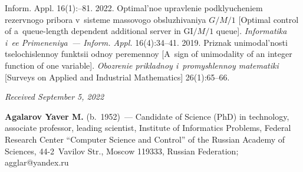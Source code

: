 \begin{multicols}{2}
{{\begin{thebibliography}{9}
{Inform. Appl.} 16(1):--81.
   2022. Op\-ti\-mal'\-noe uprav\-le\-nie pod\-klyu\-che\-niem re\-zerv\-no\-go pri\-bo\-ra 
v~sis\-te\-me mas\-so\-vo\-go ob\-slu\-zhi\-va\-niya $G/M/1$ [Optimal control of a~queue-length dependent 
additional server in $\mathrm{GI}/M/1$ queue]. \textit{Informatika i~ee Primeneniya~--- Inform. Appl.} 
16(4):34--41.
   2019. Pri\-znak uni\-mo\-dal'\-nosti tse\-lo\-chis\-len\-noy funk\-tsii od\-noy 
pe\-re\-men\-noy [A~sign of unimodality of an integer function of one variable]. \textit{Obozrenie 
prikladnoy i~promyshlennoy matematiki} [Surveys on Applied and Industrial Mathematics]  
26(1):65--66.
 \end{thebibliography}

 }
 }

\end{multicols}

\vspace*{-6pt}

\hfill{\small\textit{Received September 5, 2022}} 
  
  \Contrl
  
  \noindent
  \textbf{Agalarov Yaver M.} (b.\ 1952)~--- Candidate of Science (PhD) in technology, associate 
professor, leading scientist, Institute of Informatics Problems, Federal Research Center ``Computer 
Science and Control'' of the Russian Academy of Sciences, 44-2~Vavilov Str., Moscow 119333, 
Russian Federation; \mbox{agglar@yandex.ru}
  
  

   
\label{end\stat}

\renewcommand{\bibname}{\protect\rm Литература} 
   